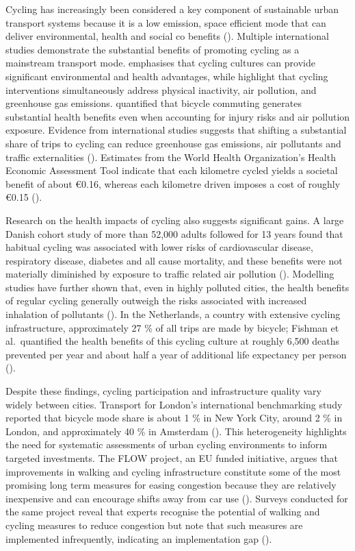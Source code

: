 \documentclass[
  12pt,
  oneside]{book}
\begin{document}
Cycling has increasingly been considered a key component of sustainable urban transport systems because it is a low emission, space efficient mode that can deliver environmental, health and social co benefits (\textcite{yanocha_economic_2022}). Multiple international studies demonstrate the substantial benefits of promoting cycling as a mainstream transport mode. \textcite{aldred_why_2014} emphasises that cycling cultures can provide significant environmental and health advantages, while \textcite{fraser_cycling_2011} highlight that cycling interventions simultaneously address physical inactivity, air pollution, and greenhouse gas emissions. \textcite{mueller_health_2015} quantified that bicycle commuting generates substantial health benefits even when accounting for injury risks and air pollution exposure. Evidence from international studies suggests that shifting a substantial share of trips to cycling can reduce greenhouse gas emissions, air pollutants and traffic externalities (\textcite{goel_cycling_2021}). Estimates from the World Health Organization's Health Economic Assessment Tool indicate that each kilometre cycled yields a societal benefit of about €0.16, whereas each kilometre driven imposes a cost of roughly €0.15 (\textcite{yanocha_economic_2022}).

Research on the health impacts of cycling also suggests significant gains. A large Danish cohort study of more than 52,000 adults followed for 13 years found that habitual cycling was associated with lower risks of cardiovascular disease, respiratory disease, diabetes and all cause mortality, and these benefits were not materially diminished by exposure to traffic related air pollution (\textcite{logan_benefits_2023}). Modelling studies have further shown that, even in highly polluted cities, the health benefits of regular cycling generally outweigh the risks associated with increased inhalation of pollutants (\textcite{logan_benefits_2023}). In the Netherlands, a country with extensive cycling infrastructure, approximately 27 \% of all trips are made by bicycle; Fishman et\,al.~quantified the health benefits of this cycling culture at roughly 6,500 deaths prevented per year and about half a year of additional life expectancy per person (\textcite{fishman_dutch_2015}).

Despite these findings, cycling participation and infrastructure quality vary widely between cities. Transport for London's international benchmarking study reported that bicycle mode share is about 1 \% in New York City, around 2 \% in London, and approximately 40 \% in Amsterdam (\textcite{tfl_international_2014}). This heterogeneity highlights the need for systematic assessments of urban cycling environments to inform targeted investments. The FLOW project, an EU funded initiative, argues that improvements in walking and cycling infrastructure constitute some of the most promising long term measures for easing congestion because they are relatively inexpensive and can encourage shifts away from car use (\textcite{koska_role_nodate}). Surveys conducted for the same project reveal that experts recognise the potential of walking and cycling measures to reduce congestion but note that such measures are implemented infrequently, indicating an implementation gap (\textcite{koska_role_nodate}).
\end{document}
